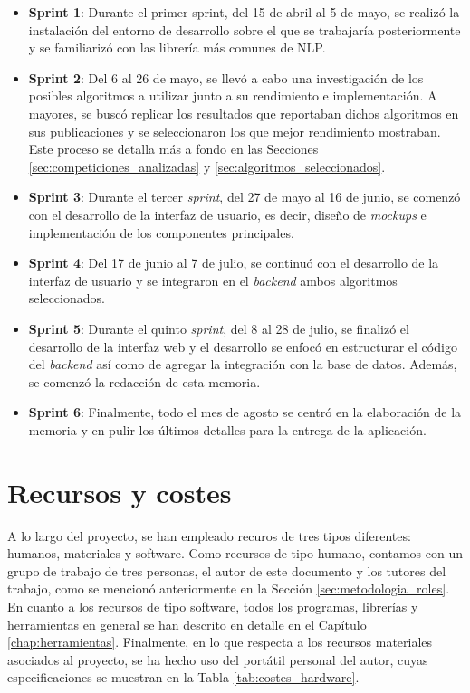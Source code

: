 \begin{itemize}
	\item \textbf{Sprint 1}: Durante el primer sprint, del 15 de abril al 5 de mayo, se realizó la instalación del entorno
	      de desarrollo sobre el que se trabajaría posteriormente y se familiarizó con las librería más comunes de NLP.
	\item \textbf{Sprint 2}: Del 6 al 26 de mayo, se llevó a cabo una investigación de los posibles algoritmos a utilizar
	      junto a su rendimiento e implementación. A mayores, se buscó replicar los resultados que reportaban dichos algoritmos
	      en sus publicaciones y se seleccionaron los que mejor rendimiento mostraban. Este proceso se detalla más a fondo en las Secciones \ref{sec:competiciones_analizadas} y \ref{sec:algoritmos_seleccionados}.
	\item \textbf{Sprint 3}: Durante el tercer \textit{sprint}, del 27 de mayo al 16 de junio, se comenzó con el desarrollo
	      de la interfaz de usuario, es decir, diseño de \textit{mockups} e implementación de los componentes principales.
	\item \textbf{Sprint 4}: Del 17 de junio al 7 de julio, se continuó con el desarrollo de la interfaz de usuario y se integraron
	      en el \textit{backend} ambos algoritmos seleccionados.
	\item \textbf{Sprint 5}: Durante el quinto \textit{sprint}, del 8 al 28 de julio, se finalizó el desarrollo de la interfaz web
	      y el desarrollo se enfocó en estructurar el código del \textit{backend} así como de agregar la integración con la base de datos.
	      Además, se comenzó la redacción de esta memoria.
	\item \textbf{Sprint 6}: Finalmente, todo el mes de agosto se centró en la elaboración de la memoria y en pulir los últimos detalles
	      para la entrega de la aplicación.
\end{itemize}

\section{Recursos y costes}
\label{sec:planificacion_costes}

A lo largo del proyecto, se han empleado recuros de tres tipos diferentes: humanos, materiales y software.
Como recursos de tipo humano,
contamos con un grupo de trabajo de tres personas, el autor de este documento y los tutores del trabajo,
como se mencionó anteriormente en la Sección \ref{sec:metodologia_roles}.
En cuanto a los recursos de tipo software, todos los programas, librerías y herramientas en general
se han descrito en detalle en el Capítulo \ref{chap:herramientas}.
Finalmente, en lo que respecta a los recursos materiales asociados al proyecto, se ha hecho uso del portátil personal del autor,
cuyas especificaciones se muestran en la Tabla \ref{tab:costes_hardware}.

